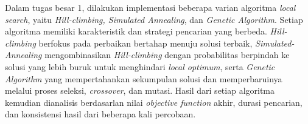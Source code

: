 Dalam tugas besar 1, dilakukan implementasi beberapa varian algoritma \textit{local search}, yaitu \textit{Hill-climbing, Simulated Annealing}, dan \textit{Genetic Algorithm}. Setiap algoritma memiliki karakteristik dan strategi pencarian yang berbeda. \textit{Hill-climbing} berfokus pada perbaikan bertahap menuju solusi terbaik, \textit{Simulated-Annealing} mengombinasikan \textit{Hill-climbing} dengan probabilitas berpindah ke solusi yang lebih buruk untuk menghindari \textit{local optimum}, serta \textit{Genetic Algorithm} yang mempertahankan sekumpulan solusi dan memperbaruinya melalui proses seleksi, \textit{crossover}, dan mutasi. Hasil dari setiap algoritma kemudian dianalisis berdasarlan nilai \textit{objective function} akhir, durasi pencarian, dan konsistensi hasil dari beberapa kali percobaan.